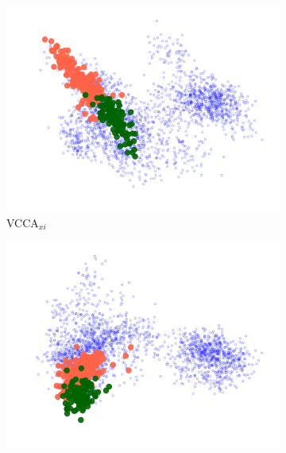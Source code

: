 


\begin{figure}[t]
     \centering
     \begin{subfigure}[b]{0.3\textwidth}
         \centering
         \includegraphics[width=\textwidth]{PaperB/figures_and_tables/latent_space_visualizations/apples_new/pca_latent_apples_vcca_xi_seed2.png}
         \caption{VCCA$_{x i}$}
         \label{fig:pca_vcca_xi_apples}
     \end{subfigure} 
     \begin{subfigure}[b]{0.3\textwidth}
         \centering
         \includegraphics[width=\textwidth]{PaperB/figures_and_tables/latent_space_visualizations/apples_new/pca_latent_apples_vcca_xw_seed2.png}

\end{subfigure}
\end{figure}
